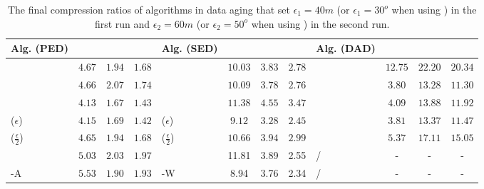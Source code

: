 {   	 	
\begin{table}
	\caption{\small The final compression ratios of algorithms in data aging that set $\epsilon_1=40m$ (or $\epsilon_1=30^o$ when using \dad) in the first run and $\epsilon_2=60m$ (or $\epsilon_2=50^o$ when using \dad) in the second run.}
	\centering
	\scriptsize
	\begin{tabular}{|l|c|c|c|l|c|c|c|l|c|c|c|}
		\hline
		\bf{Alg. (PED)}  &\ucar &\geolife &\mopsi & \bf{Alg. (SED)}  &\ucar &\geolife &\mopsi &\bf{Alg. (DAD)}  &\ucar &\geolife &\mopsi \\
		\hline  		
		{\dpa} &	$4.67$ & $1.94 $ &	$1.68$	&\dpa &$10.03$ &$3.83$ & $2.78 $ & \dpa	& $12.75$	& $22.20$	& $20.34 $ \\
		\hline
		{\tpa} &	$4.66$ & $	2.07 $ &	$1.74 $	&\tpa 	& $10.09$& $3.78$ &$2.76$ & \tpa	& $3.80$	& $13.28$	& $11.30$ \\
		\hline
		{\bqsa} &	$4.13$ & $1.67 $ &	$ 1.43 $	&\squishe &$11.38$ &$4.55$ & $3.47$ & \opwa	& $4.09$	& $13.88$	& $11.92$ \\
		\hline
		{\siped($\epsilon$)} &	$4.15 $ & $1.69 $ &	$1.42$	&\cised($\epsilon$) & $9.12$ &$3.28$ &$2.45 $ & \interval	& $3.81$	& $13.37$	& $11.47 $ \\
		\hline
		{\siped($\frac{\epsilon}{2}$)} &	$4.65 $ & $1.94$ &	$1.68$ &\cised($\frac{\epsilon}{2}$) &$10.66 $ & $3.94$ & $2.99 $& \intersec	& $5.37$	& $17.11$	& $15.05 $ \\
		\hline
		{\operb} &	$5.03$ & $2.03 $ &	$ 1.97 $	& {\dagots} &11.81 &3.89 &2.55 & / &- &- & - \\
		\hline
		{\operb-A} &	${5.53} $ & ${1.90} $ & ${1.93} $	& {\cised-W} &8.94 &3.76 &2.34 & / &- &- &- \\
		\hline
	\end{tabular}
	\label{tab:aging-cr}	
	\vspace{-1ex}
\end{table}
  	 	
}
